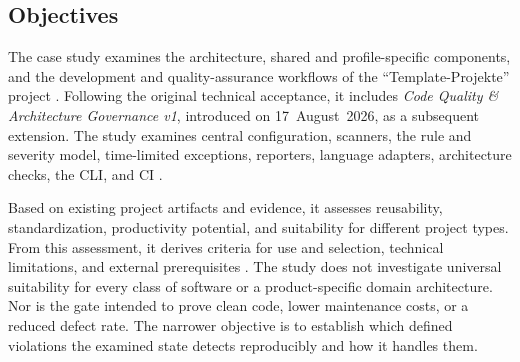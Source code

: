 \subsection{Objectives}
\label{subsec:zielsetzung}

The case study examines the architecture, shared and profile-specific
components, and the development and quality-assurance workflows of the
\enquote{Template-Projekte} project
\parencite{kleiveist2026architecture,kleiveist2026tooling}. Following the
original technical acceptance, it includes \emph{Code Quality \& Architecture
Governance v1}, introduced on 17~August~2026, as a subsequent extension. The
study examines central configuration, scanners, the rule and severity model,
time-limited exceptions, reporters, language adapters, architecture checks,
the CLI, and CI
\parencite{kleiveist2026quality-policy,kleiveist2026governance-commit}.

Based on existing project artifacts and evidence, it assesses reusability,
standardization, productivity potential, and suitability for different project
types. From this assessment, it derives criteria for use and selection,
technical limitations, and external prerequisites
\parencite{kleiveist2026acceptance}. The study does not investigate universal
suitability for every class of software or a product-specific domain
architecture. Nor is the gate intended to prove clean code, lower maintenance
costs, or a reduced defect rate. The narrower objective is to establish which
defined violations the examined state detects reproducibly and how it handles
them.
